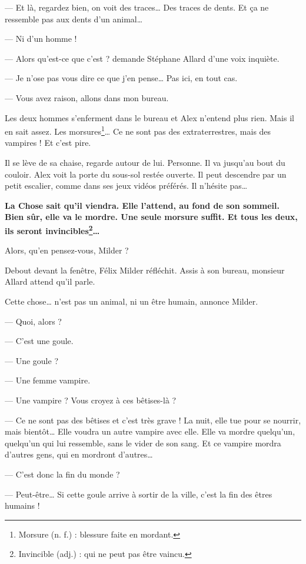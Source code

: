 --- Et là, regardez bien, on voit des traces\ldots{} Des traces de dents. Et \c{c}a ne ressemble pas aux dents d'un animal\ldots{}

--- Ni d'un homme !

--- Alors qu'est-ce que c'est ? demande Stéphane Allard d'une voix inquiète.

--- Je n'ose pas vous dire ce que j'en pense\ldots{} Pas ici, en tout cas.

--- Vous avez raison, allons dans mon bureau. \fg{}

Les deux hommes s'enferment dans le bureau et Alex n'entend plus rien. Mais il en sait assez. Les morsures\footnote{Morsure
(n. f.) : blessure faite en mordant.}\ldots{} Ce ne sont pas des extraterrestres, mais des vampires ! Et c'est pire.

Il se lève de sa chaise, regarde autour de lui. Personne. Il va jusqu'au bout du couloir. Alex voit la porte du sous-sol restée
ouverte. Il peut descendre par un petit escalier, comme dans ses jeux vidéos préférés. Il n'hésite pas\ldots{}

\textbf{La Chose sait qu'il viendra. Elle l'attend, au fond de son sommeil. Bien sûr, elle va le mordre. Une seule morsure suffit.
Et tous les deux, ils seront invincibles\footnote{Invincible (adj.) : qui ne peut pas être vaincu.}\ldots{}}

\og Alors, qu'en pensez-vous, Milder ? \fg{}

Debout devant la fenêtre, Félix Milder réfléchit. Assis à son bureau, monsieur Allard attend qu'il parle.

\og Cette chose\ldots{} n'est pas un animal, ni un être humain, annonce Milder.

--- Quoi, alors ?

--- C'est une goule.

--- Une goule ?

--- Une femme vampire.

--- Une vampire ? Vous croyez à ces bêtises-là ?

--- Ce ne sont pas des bêtises et c'est très grave ! La nuit, elle tue pour se nourrir, mais bientôt\ldots{} Elle voudra un autre
    vampire avec elle. Elle va mordre quelqu'un, quelqu'un qui lui ressemble, sans le vider de son sang. Et ce vampire mordra
    d'autres gens, qui en mordront d'autres\ldots{}

--- C'est donc la fin du monde ?

--- Peut-être\ldots{} Si cette goule arrive à sortir de la ville, c'est la fin des êtres humains !

